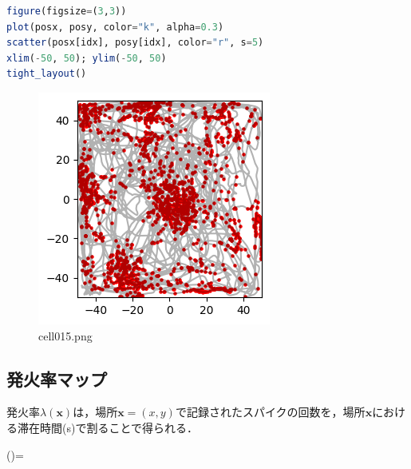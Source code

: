 \begin{lstlisting}[language=julia]
figure(figsize=(3,3))
plot(posx, posy, color="k", alpha=0.3)
scatter(posx[idx], posy[idx], color="r", s=5)
xlim(-50, 50); ylim(-50, 50)
tight_layout()
\end{lstlisting}
\begin{figure}[ht]
	\centering
	\includegraphics[scale=0.8, max width=\linewidth]{./fig/appendix/grid-cells-decoding/cell015.png}
	\caption{cell015.png}
	\label{cell015.png}
\end{figure}
\subsection{発火率マップ}
発火率$\lambda(\boldsymbol{x})$は，場所$\boldsymbol{x}=(x,y)$で記録されたスパイクの回数を，場所$\boldsymbol{x}$における滞在時間(s)で割ることで得られる． 
 
\lambda()= 
 
